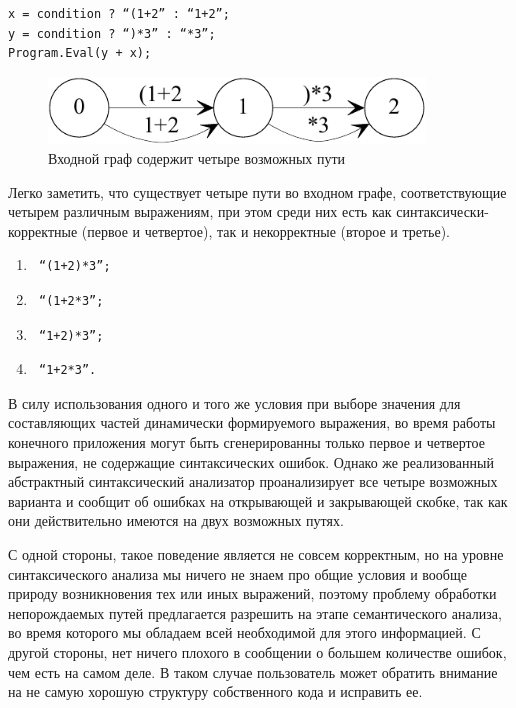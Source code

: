 \documentclass{matmex-diploma}
\begin{document}
\begin{verbatim}
x = condition ? “(1+2” : “1+2”;
y = condition ? “)*3” : “*3”;
Program.Eval(y + x);
\end{verbatim}

\begin{figure}[h]
 \label{instead}
 \centering
 \includegraphics[width=10cm]{4insteadOf2.pdf}
 \caption{Входной граф содержит четыре возможных пути}
 \label{instead}
\end{figure}

Легко заметить, что существует четыре пути во входном графе, соответствующие 
четырем различным выражениям, при этом среди них есть как синтаксически-корректные 
(первое и четвертое), так и некорректные (второе и третье).

\begin{enumerate}[1)]
    \item \begin{verbatim} “(1+2)*3”; \end{verbatim}
    \item \begin{verbatim} “(1+2*3”; \end{verbatim}
    \item \begin{verbatim} “1+2)*3”; \end{verbatim}
    \item \begin{verbatim} “1+2*3”. \end{verbatim}
\end{enumerate}

В силу использования одного и того же условия при выборе значения для составляющих 
частей динамически формируемого выражения, во время работы конечного приложения 
могут быть сгенерированны только первое и четвертое выражения, не содержащие 
синтаксических ошибок. Однако же реализованный абстрактный синтаксический анализатор 
проанализирует все четыре возможных варианта и сообщит об ошибках на открывающей 
и закрывающей скобке, так как они действительно имеются на двух возможных путях. 

С одной стороны, такое поведение является не совсем корректным, но на уровне 
синтаксического анализа мы ничего не знаем про общие условия и вообще природу 
возникновения тех или иных выражений, поэтому проблему обработки непорождаемых 
путей предлагается разрешить на этапе семантического анализа, во время которого 
мы обладаем всей необходимой для этого информацией. С другой стороны, нет ничего 
плохого в сообщении о большем количестве ошибок, чем есть на самом деле. В таком 
случае пользователь может обратить внимание на не самую хорошую структуру 
собственного кода и исправить ее.
\end{document}
